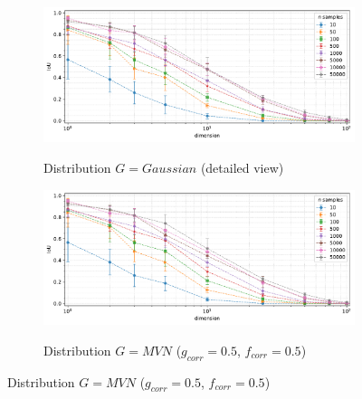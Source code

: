 \begin{figure}[t]
    \centering
    \vspace{-0.75em}
    \begin{subfigure}[b]{0.9\textwidth}
        \centering
        \caption{\small Distribution $G = Gaussian$ (detailed view)}
        \includegraphics[width=\textwidth]{images/overlapping/trend-overlapping-IoU(dimension)-distribution_gaussian-samples_10,50,100,500,1000,5000,10000,50000-aggregated-detailed.pdf}
        \label{fig:iou-gaussian-detailed}
    \end{subfigure}

    \vspace{-0.75em}
    \begin{subfigure}[b]{0.9\textwidth}
        \centering
        \caption{\small Distribution $G = MVN$ ($g_{corr} = 0.5$, $f_{corr} = 0.5$)}
        \includegraphics[width=\textwidth]{images/overlapping/trend-overlapping-IoU(dimension)-distribution_correlated-50-50-samples_10,50,100,500,1000,5000,10000,50000-aggregated-detailed.pdf}
        \label{fig:iou-correlated-detailed}
    \end{subfigure}


\end{figure}
